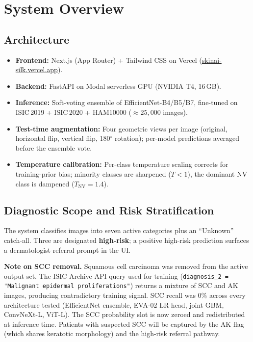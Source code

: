 \documentclass[11pt, letterpaper]{article}
\newcommand{\highriskbadge}[1]{\textcolor{highrisk}{\textbf{#1}}}
\newcommand{\code}[1]{\texttt{#1}}
\begin{document}
\section{System Overview}

\subsection{Architecture}
\begin{itemize}[leftmargin=1.4em, itemsep=2pt]
  \item \textbf{Frontend:} Next.js (App Router) + Tailwind CSS on Vercel
        (\href{https://skinai-silk.vercel.app}{skinai-silk.vercel.app}).
  \item \textbf{Backend:} FastAPI on Modal serverless GPU (NVIDIA T4, 16\,GB).
  \item \textbf{Inference:} Soft-voting ensemble of EfficientNet-B4/B5/B7,
        fine-tuned on ISIC\,2019 + ISIC\,2020 + HAM10000 (${\approx}25{,}000$ images).
  \item \textbf{Test-time augmentation:} Four geometric views per image
        (original, horizontal flip, vertical flip, 180$^\circ$ rotation);
        per-model predictions averaged before the ensemble vote.
  \item \textbf{Temperature calibration:} Per-class temperature scaling corrects
        for training-prior bias; minority classes are sharpened ($T < 1$),
        the dominant NV class is dampened ($T_{\text{NV}} = 1.4$).
\end{itemize}

\subsection{Diagnostic Scope and Risk Stratification}
The system classifies images into seven active categories plus an ``Unknown'' catch-all.
Three are designated \highriskbadge{high-risk}; a positive high-risk prediction
surfaces a dermatologist-referral prompt in the UI.

\textbf{Note on SCC removal.}
Squamous cell carcinoma was removed from the active output set.
The ISIC Archive API query used for training
(\code{diagnosis\_2 = "Malignant epidermal proliferations"})
returns a mixture of SCC and AK images, producing contradictory training signal.
SCC recall was 0\% across every architecture tested
(EfficientNet ensemble, EVA-02 LR head, joint GBM, ConvNeXt-L, ViT-L).
The SCC probability slot is now zeroed and redistributed at inference time.
Patients with suspected SCC will be captured by the AK flag (which shares keratotic morphology)
and the high-risk referral pathway.
\end{document}
